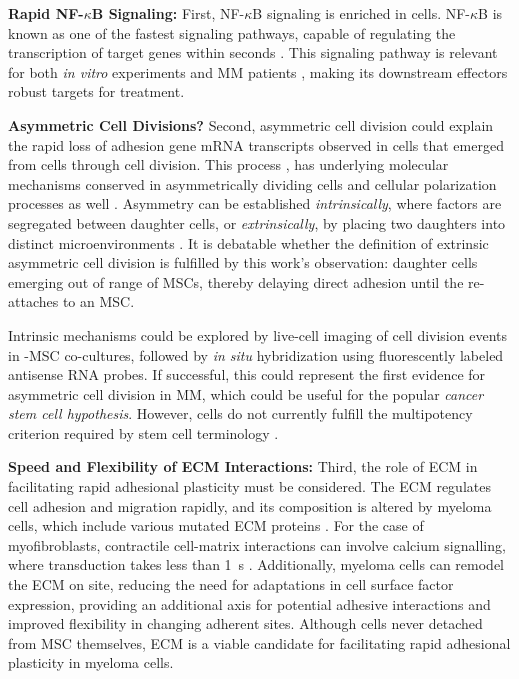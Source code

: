 \textbf{Rapid NF-$\kappa$B Signaling:}
First, NF-$\kappa$B signaling is enriched in \MAina cells.
NF-$\kappa$B is known as one of the fastest signaling pathways, capable of
regulating the transcription of target genes within seconds
\cite{gallego-sellesFastRegulationNFkB2022,
      zarnegarNoncanonicalNFkBActivation2008}. This signaling pathway is relevant for
both \textit{in vitro} experiments and MM patients
\cite{sarinEvaluatingEfficacyMultiple2020}, making its downstream effectors
robust targets for treatment.

\textbf{Asymmetric Cell Divisions?}
Second, asymmetric cell division could explain the rapid loss of adhesion gene
mRNA transcripts observed in \nMAina cells that emerged from \MAina cells
through cell division. This process , has
underlying molecular mechanisms conserved in asymmetrically dividing
cells and cellular polarization processes as well \cite{inabaAsymmetricStemCell2012,
      stjohnstonCellPolarityEggs2010}. Asymmetry can be established
\emph{intrinsically}, where factors are segregated between daughter cells, or
\emph{extrinsically}, by placing two daughters into distinct microenvironments
\cite{inabaAsymmetricStemCell2012}. It is debatable whether the definition of
extrinsic asymmetric cell division is fulfilled by this work's observation:
\nMAina daughter cells emerging out of range of \acp{MSC}, thereby delaying
direct adhesion until the \nMAina re-attaches to an \ac{MSC}.

Intrinsic mechanisms could be explored by live-cell imaging of cell division
events in \INA-\ac{MSC} co-cultures, followed by \textit{in situ} hybridization
using fluorescently labeled antisense RNA probes. If successful, this could
represent the first evidence for asymmetric cell division in MM, which could be
useful for the popular \emph{cancer stem cell hypothesis}. However, \MAina cells
do not currently fulfill the multipotency criterion required by stem cell
terminology \cite{johnsenMyelomaStemCell2016, liAsymmetricCellDivision2022}.

\textbf{Speed and Flexibility of ECM Interactions:}
Third, the role of \ac{ECM} in facilitating rapid adhesional plasticity must be
considered. The \ac{ECM} regulates cell adhesion and migration rapidly, and its
composition is altered by myeloma cells, which include various mutated \ac{ECM}
proteins \cite{ibraheemBMMSCsderivedECMModifies2019,
      eversPrognosticValueExtracellular2023}. For the case of myofibroblasts,
contractile cell-matrix interactions can involve calcium signalling, where
transduction takes less than \SI{1}{\second} \cite{yamadaCell3DMatrix2022}.
Additionally, myeloma cells can remodel the \ac{ECM} on site, reducing the need
for adaptations in cell surface factor expression, providing an additional axis
for potential adhesive interactions and improved flexibility in changing
adherent sites. Although \MAina cells never detached from \ac{MSC} themselves,
\ac{ECM} is a viable candidate for facilitating rapid adhesional plasticity in
myeloma cells.



